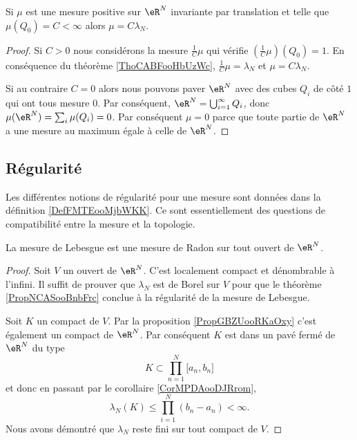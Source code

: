 \begin{corollary}       \label{CorKGMRooHWOQGP}
    Si \( \mu\) est une mesure positive sur \( \eR^N\) invariante par translation et telle que \( \mu(Q_0)=C<\infty\) alors \( \mu=C\lambda_N\).
\end{corollary}

\begin{proof}
    Si \( C>0\) nous considérons la mesure \( \frac{1}{ C }\mu\) qui vérifie \( (\frac{1}{ C }\mu)(Q_0)=1\). En conséquence du théorème \ref{ThoCABFooHbUzWc}, \( \frac{1}{ C }\mu=\lambda_N\) et \( \mu=C\lambda_N\).

    Si au contraire \( C=0\) alors nous pouvons paver \( \eR^N\) avec des cubes \( Q_i\) de côté \( 1\) qui ont tous mesure \( 0\). Par conséquent, \( \eR^N=\bigcup_{i=1}^{\infty}Q_i\), donc \( \mu(\eR^N)=\sum_i\mu(Q_i)=0\). Par conséquent \( \mu=0\) parce que toute partie de \( \eR^N\) a une mesure au maximum égale à celle de \( \eR^N\).
\end{proof}

\subsection{Régularité}

Les différentes notions de régularité pour une mesure sont données dans la définition \ref{DefFMTEooMjbWKK}. Ce sont essentiellement des questions de compatibilité entre la mesure et la topologie.
\begin{proposition}
    La mesure de Lebesgue est une mesure de Radon sur tout ouvert de \( \eR^N\).
\end{proposition}

\begin{proof}
    Soit \( V\) un ouvert de \( \eR^N\). C'est localement compact et dénombrable à l'infini. Il suffit de prouver que \( \lambda_N\) est de Borel sur \( V\) pour que le théorème \ref{PropNCASooBnbFrc} conclue à la régularité de la mesure de Lebesgue.

    Soit \( K\) un compact de \( V\). Par la proposition \ref{PropGBZUooRKaOxy} c'est également un compact de \( \eR^N\). Par conséquent \( K\) est dans un pavé fermé de \( \eR^N\) du type
    \begin{equation}
        K\subset \prod_{n=1}^N\mathopen[ a_n , b_n \mathclose]
    \end{equation}
    et donc en passant par le corollaire \ref{CorMPDAooDJRrom},
    \begin{equation}
        \lambda_N(K)\leq \prod_{i=1}^N(b_n-a_n)<\infty.
    \end{equation}
    Nous avons démontré que \( \lambda_N\) reste fini sur tout compact de \( V\).
\end{proof}
